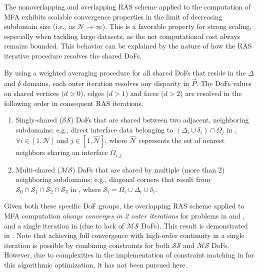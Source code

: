 
The nonoverlapping and overlapping RAS scheme applied to the computation of MFA exhibits scalable convergence properties in the limit of decreasing subdomain size (i.e., as $\mathcal{N} \to \infty$). This is a favorable property for strong scaling, especially when tackling large datasets, as the net computational cost always remains bounded. This behavior can be explained by the nature of how the RAS iterative procedure resolves the shared DoFs.

By using a weighted averaging procedure for all shared DoFs that reside in the $\Delta$ and $\delta$ domains, each outer iteration resolves any disparity in $\vec{P}$. The DoFs values on shared vertices ($d > 0$), edges ($d > 1$) and faces ($d > 2$) are resolved in the following order in consequent RAS iterations.
%
\begin{enumerate}
	\item Singly-shared ($\mathcal{SS}$) DoFs that are shared between two adjacent, neighboring subdomains; e.g., direct interface data belonging to $(\Delta_i \cup \delta_i) \cap \Omega_j$ in , $\forall i \in [1, \mathcal{N}]$ and $j \in [1, \hat{\mathcal{N}}]$, where $\hat{\mathcal{N}}$ represents the set of nearest neighbors sharing an interface $\Omega_{i,j}$
	\item Multi-shared ($\mathcal{MS}$) DoFs that are shared by multiple (more than 2) neighboring subdomains; e.g., diagonal corners that result from $\mathcal{S}_0 \cap \mathcal{S}_1 \cap \mathcal{S}_2 \cap \mathcal{S}_3$ in , where $\mathcal{S}_i=\Omega_i\cup\Delta_i\cup\delta_i$.
\end{enumerate}
%
Given both these specific DoF groups, the overlapping RAS scheme applied to MFA computation {\em always converges in 2 outer iterations} for problems in  and , and a single iteration in  (due to lack of $\mathcal{MS}$ DoFs). This result is demonstrated in . Note that achieving full convergence with high-order continuity in a single iteration is possible by combining constraints for both $\mathcal{SS}$ and $\mathcal{MS}$ DoFs. However, due to complexities in the implementation of constraint matching in  for this algorithmic optimization, it has not been pursued here.%

